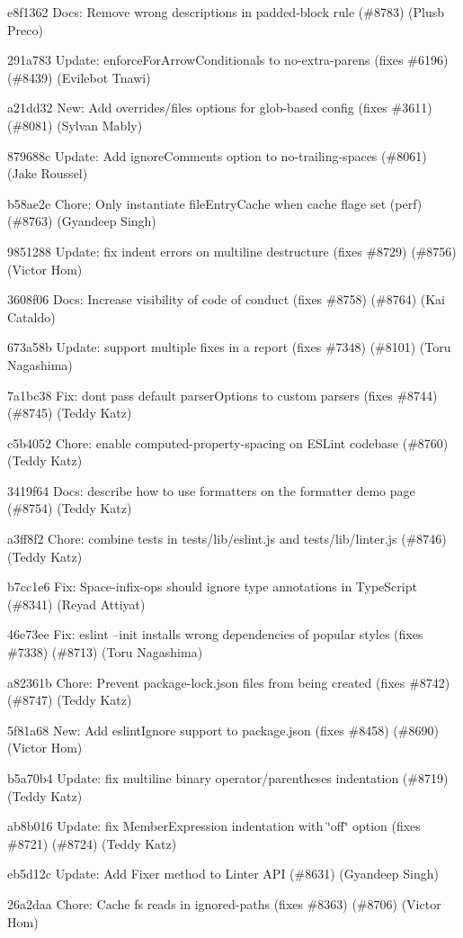 \begin{DoxyItemize}
\item e8f1362 Docs\+: Remove wrong descriptions in {\ttfamily padded-\/block} rule (\#8783) (Plusb Preco)
\item 291a783 Update\+: {\ttfamily enforce\+For\+Arrow\+Conditionals} to {\ttfamily no-\/extra-\/parens} (fixes \#6196) (\#8439) (Evilebot Tnawi)
\item a21dd32 New\+: Add {\ttfamily overrides}/{\ttfamily files} options for glob-\/based config (fixes \#3611) (\#8081) (Sylvan Mably)
\item 879688c Update\+: Add ignore\+Comments option to no-\/trailing-\/spaces (\#8061) (Jake Roussel)
\item b58ae2e Chore\+: Only instantiate file\+Entry\+Cache when cache flage set (perf) (\#8763) (Gyandeep Singh)
\item 9851288 Update\+: fix indent errors on multiline destructure (fixes \#8729) (\#8756) (Victor Hom)
\item 3608f06 Docs\+: Increase visibility of code of conduct (fixes \#8758) (\#8764) (Kai Cataldo)
\item 673a58b Update\+: support multiple fixes in a report (fixes \#7348) (\#8101) (Toru Nagashima)
\item 7a1bc38 Fix\+: don\textquotesingle{}t pass default parser\+Options to custom parsers (fixes \#8744) (\#8745) (Teddy Katz)
\item c5b4052 Chore\+: enable computed-\/property-\/spacing on E\+S\+Lint codebase (\#8760) (Teddy Katz)
\item 3419f64 Docs\+: describe how to use formatters on the formatter demo page (\#8754) (Teddy Katz)
\item a3ff8f2 Chore\+: combine tests in tests/lib/eslint.\+js and tests/lib/linter.\+js (\#8746) (Teddy Katz)
\item b7cc1e6 Fix\+: Space-\/infix-\/ops should ignore type annotations in Type\+Script (\#8341) (Reyad Attiyat)
\item 46e73ee Fix\+: eslint --init installs wrong dependencies of popular styles (fixes \#7338) (\#8713) (Toru Nagashima)
\item a82361b Chore\+: Prevent package-\/lock.\+json files from being created (fixes \#8742) (\#8747) (Teddy Katz)
\item 5f81a68 New\+: Add eslint\+Ignore support to package.\+json (fixes \#8458) (\#8690) (Victor Hom)
\item b5a70b4 Update\+: fix multiline binary operator/parentheses indentation (\#8719) (Teddy Katz)
\item ab8b016 Update\+: fix Member\+Expression indentation with \char`\"{}off\char`\"{} option (fixes \#8721) (\#8724) (Teddy Katz)
\item eb5d12c Update\+: Add Fixer method to Linter A\+PI (\#8631) (Gyandeep Singh)
\item 26a2daa Chore\+: Cache fs reads in ignored-\/paths (fixes \#8363) (\#8706) (Victor Hom)
\end{DoxyItemize}

